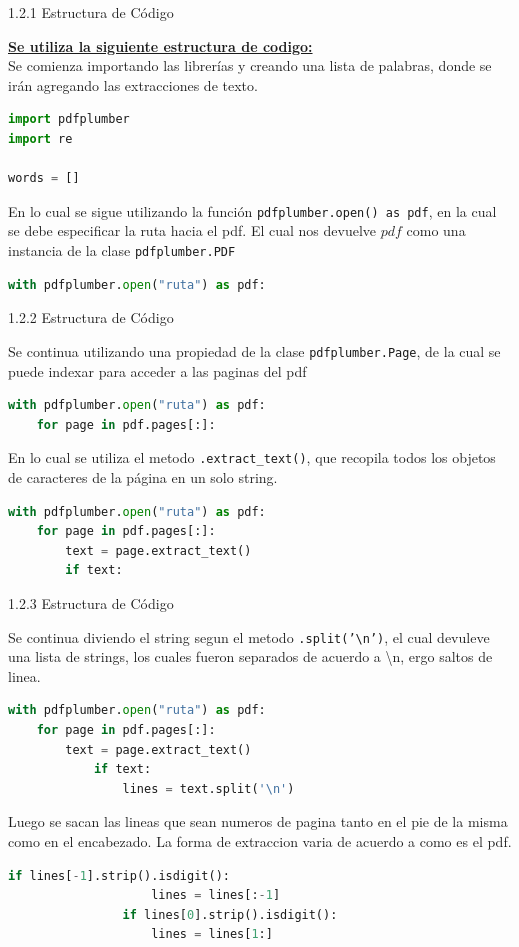 \documentclass{beamer}
\begin{document}
\begin{frame}[fragile]{1.2.1 Estructura de Código}
	
	\justifying
	\textbf{\underline{Se utiliza la siguiente estructura de codigo:}}\\
	\vspace{0.1cm}
	Se comienza importando las librerías y creando una lista de palabras, donde se irán agregando las extracciones de texto.
	\begin{lstlisting}[language=Python]
import pdfplumber
import re

words = []
	\end{lstlisting}
	\justifying
	En lo cual se sigue utilizando la función \texttt{pdfplumber.open() as pdf}, en la cual se debe especificar la ruta hacia el pdf. El cual nos devuelve $pdf$ como una instancia de la clase \texttt{pdfplumber.PDF}
		\begin{lstlisting}[language=Python]
with pdfplumber.open("ruta") as pdf:
	\end{lstlisting}
\end{frame}

	
\begin{frame}[fragile]{1.2.2 Estructura de Código}
	
	\justifying
	Se continua utilizando una propiedad de la clase \texttt{pdfplumber.Page}, de la cual se puede indexar para acceder a las paginas del pdf
	\begin{lstlisting}[language=Python]
with pdfplumber.open("ruta") as pdf:
	for page in pdf.pages[:]:
	\end{lstlisting}
	\justifying
	En lo cual se utiliza el metodo \texttt{.extract\_text()}, que recopila todos los objetos de caracteres de la página en un solo string.
	\begin{lstlisting}[language=Python]
with pdfplumber.open("ruta") as pdf:
	for page in pdf.pages[:]:
		text = page.extract_text()
		if text:
	\end{lstlisting}
\end{frame}
	
\begin{frame}[fragile]{1.2.3 Estructura de Código}
	
	\justifying
	Se continua diviendo el string segun el metodo \texttt{.split('\textbackslash n')}, el cual devuleve una lista de strings, los cuales fueron separados de acuerdo a \textbackslash n, ergo saltos de linea.
	\begin{lstlisting}[language=Python]
with pdfplumber.open("ruta") as pdf:
	for page in pdf.pages[:]:
		text = page.extract_text()
			if text:
				lines = text.split('\n')
	\end{lstlisting}
	\justifying
	Luego se sacan las lineas que sean numeros de pagina tanto en el pie de la misma como en el encabezado. La forma de extraccion varia de acuerdo a como es el pdf.
	\begin{lstlisting}[language=Python]
				if lines[-1].strip().isdigit():
					lines = lines[:-1]
				if lines[0].strip().isdigit():
					lines = lines[1:]
				
	\end{lstlisting}
\end{frame}
	
\end{document}
